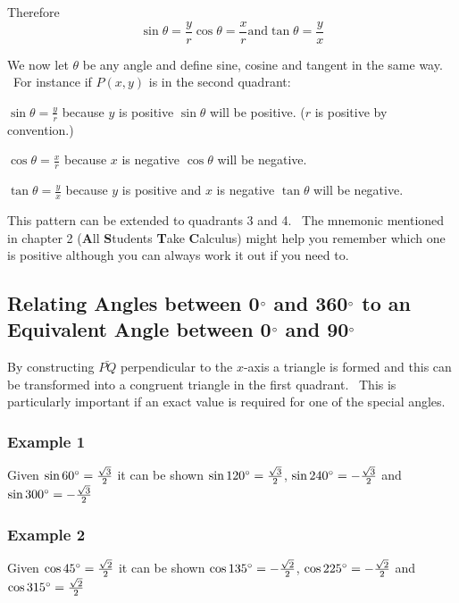 Therefore
\begin{equation*}\sin  \theta  =\frac{y}{r}\text{}\cos  \theta  =\frac{x}{r}\text{and}\tan  \theta  =\frac{y}{x}
\end{equation*}

We now let $\theta $ be any angle and define sine, cosine and tangent in the same way. \ For instance
if $P (x ,y)$ is in the second quadrant: 

   
\setlength\fboxrule{0in}\setlength\fboxsep{0.2in}


$\sin  \theta  =\frac{y}{r}$ because $y$ is positive $\sin  \theta $ will be positive. ($r$ is positive by convention.) 

$\cos  \theta  =\frac{x}{r}$ because $x$ is negative $\cos  \theta $ will be negative. 

$\tan  \theta  =\frac{y}{x}$ because $y$ is positive and $x$ is negative $\tan  \theta $ will be negative. 

This pattern can be extended to quadrants 3 and 4. \ The
mnemonic mentioned in chapter 2 (\textbf{A}ll \textbf{S}tudents \textbf{T}ake \textbf{C}alculus) might help you remember which one is positive
although you can always work it out if you need to. 

\subsection{Relating Angles between 0$\mbox{{\ensuremath{{}^\circ}}}$ and 360$\mbox{{\ensuremath{{}^\circ}}}$ to an Equivalent Angle between 0$\mbox{{\ensuremath{{}^\circ}}}$ and 90$\mbox{{\ensuremath{{}^\circ}}}$}
By constructing $\bar{PQ}$ perpendicular to the $x$-axis a triangle is formed and this can be transformed into a congruent triangle in the first quadrant. \ This
is particularly important if an exact value is required for one of the special angles. 

\subsubsection{Example 1}
Given $\sin  60 \mbox{{\ensuremath{{}^\circ}}} =\frac{\sqrt{3}}{2}$ it can be shown $\sin  120 \mbox{{\ensuremath{{}^\circ}}} =\frac{\sqrt{3}}{2}$, $\sin  240 \mbox{{\ensuremath{{}^\circ}}} = -\frac{\sqrt{3}}{2}$ and $\sin  300 \mbox{{\ensuremath{{}^\circ}}} = -\frac{\sqrt{3}}{2}$ 

\subsubsection{Example 2}
Given $\cos  45 \mbox{{\ensuremath{{}^\circ}}} =\frac{\sqrt{2}}{2}$ it can be shown $\cos  135 \mbox{{\ensuremath{{}^\circ}}} = -\frac{\sqrt{2}}{2}$, $\cos  225 \mbox{{\ensuremath{{}^\circ}}} = -\frac{\sqrt{2}}{2}$ and $\cos  315 \mbox{{\ensuremath{{}^\circ}}} =\frac{\sqrt{2}}{2}$ 

